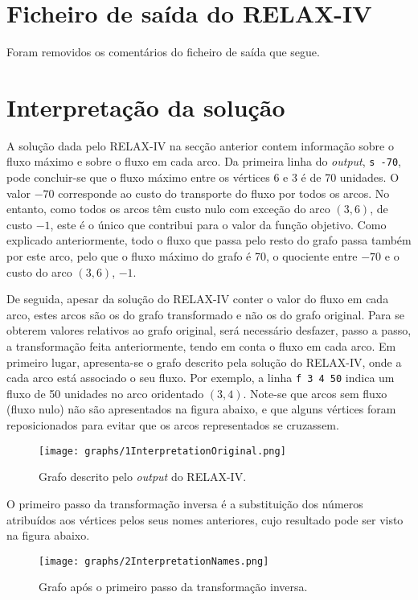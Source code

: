 \documentclass[12pt, a4paper, titlepage]{article}
\begin{document}
\section{Ficheiro de saída do RELAX-IV}
Foram removidos os comentários do ficheiro de saída que segue.


\section{Interpretação da solução}

A solução dada pelo RELAX-IV na secção anterior contem informação sobre o fluxo máximo e sobre o
fluxo em cada arco. Da primeira linha do \emph{output}, \texttt{s -70}, pode concluir-se que o fluxo
máximo entre os vértices 6 e 3 é de 70 unidades. O valor $-70$ corresponde ao custo do transporte
do fluxo por todos os arcos. No entanto, como todos os arcos têm custo nulo com exceção do arco
$(3, 6)$, de custo $-1$, este é o único que contribui para o valor da função objetivo. Como
explicado anteriormente, todo o fluxo que passa pelo resto do grafo passa também por este arco, pelo
que o fluxo máximo do grafo é 70, o quociente entre $-70$ e o custo do arco $(3, 6)$, $-1$.

De seguida, apesar da solução do RELAX-IV conter o valor do fluxo em cada arco, estes arcos são os
do grafo transformado e não os do grafo original. Para se obterem valores relativos ao grafo
original, será necessário desfazer, passo a passo, a transformação feita anteriormente, tendo em
conta o fluxo em cada arco. Em primeiro lugar, apresenta-se o grafo descrito pela solução do
RELAX-IV, onde a cada arco está associado o seu fluxo. Por exemplo, a linha \texttt{f 3 4 50} indica
um fluxo de 50 unidades no arco oridentado $(3, 4)$. Note-se que arcos sem fluxo (fluxo nulo) não
são apresentados na figura abaixo, e que alguns vértices foram reposicionados para evitar que os
arcos representados se cruzassem.

\begin{figure}[H]
    \centering
    \texttt{[image: graphs/1InterpretationOriginal.png]}
    \caption{Grafo descrito pelo \emph{output} do RELAX-IV.}
    \label{1interpretation-graph}
\end{figure}

O primeiro passo da transformação inversa é a substituição dos números atribuídos aos vértices pelos
seus nomes anteriores, cujo resultado pode ser visto na figura abaixo.

\begin{figure}[H]
    \centering
    \texttt{[image: graphs/2InterpretationNames.png]}
    \caption{Grafo após o primeiro passo da transformação inversa.}
    \label{2interpretation-graph}
\end{figure}
\end{document}
